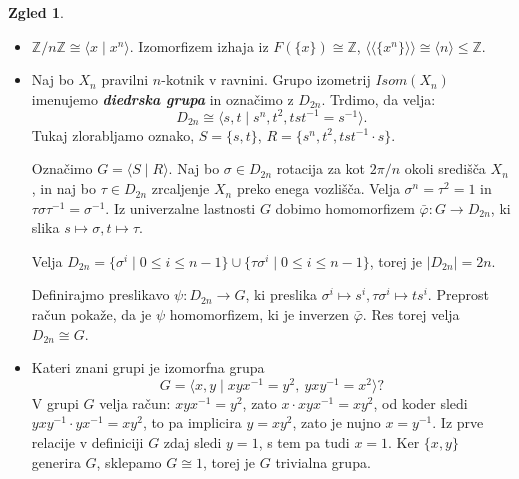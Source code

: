 \documentclass[11pt]{book}
\renewcommand{\llangle}{\langle\langle}
\renewcommand{\rrangle}{\rangle\rangle}
\def\ZZ{\mathbb{Z}}
\def\definicija{\color{rdeca}\bf\em}
\theoremstyle{definition}
\theoremstyle{zgled}
\newtheorem*{zgled}{Zgled}
\theoremstyle{odprtproblem}
\theoremstyle{domacanaloga}
\theoremstyle{izrek}
\begin{document}
\begin{zgled}
\begin{itemize}
    \item $\ZZ/n\ZZ \cong \langle x \mid x^n \rangle$. Izomorfizem izhaja iz $F(\{ x \}) \cong \ZZ$, $\llangle \{ x^n \} \rrangle \cong \langle n \rangle \leq \ZZ$.

    \item Naj bo $X_n$ pravilni $n$-kotnik v ravnini. Grupo izometrij $Isom(X_n)$ imenujemo {\definicija diedrska grupa} in označimo z $D_{2n}$. Trdimo, da velja:
    \[
    D_{2n} \cong \langle s, t \mid s^n, t^2, t s t^{-1} = s^{-1} \rangle.
    \]
    Tukaj zlorabljamo oznako, $S = \{ s, t \}$, $R = \{ s^n, t^2, t s t^{-1} \cdot s \}$. 

    Označimo $G = \langle S \mid R \rangle$. Naj bo $\sigma \in D_{2n}$ rotacija za kot $2 \pi / n$ okoli središča $X_n$, in naj bo $\tau \in D_{2n}$ zrcaljenje $X_n$ preko enega vozlišča. Velja $\sigma^n = \tau^2 = 1$ in $\tau \sigma \tau^{-1} = \sigma^{-1}$. Iz univerzalne lastnosti $G$ dobimo homomorfizem $\bar \varphi \colon G \to D_{2n}$, ki slika $s \mapsto \sigma, t \mapsto \tau$.

    Velja $D_{2n} = \{ \sigma^i \mid 0 \leq i \leq n-1 \} \cup  \{ \tau \sigma^i \mid 0 \leq i \leq n-1 \}$, torej je $|D_{2n}| = 2n$.

    Definirajmo preslikavo $\psi \colon D_{2n} \to G$, ki preslika $\sigma^i \mapsto s^i, \tau \sigma^i \mapsto t s^i$. Preprost račun pokaže, da je $\psi$ homomorfizem, ki je inverzen $\bar \varphi$. Res torej velja $D_{2n} \cong G$.

    \item Kateri znani grupi je izomorfna grupa 
    \[
    G = \langle x, y \mid x y x^{-1} = y^2, \ y x y^{-1} = x^2 \rangle?
    \]
    V grupi $G$ velja račun: $x y x^{-1} = y^2$, zato $x \cdot x y x^{-1} = x y^2$, od koder sledi $y x y^{-1} \cdot y x^{-1} = x y^2$, to pa implicira $y = x y^2$, zato je nujno $x = y^{-1}$. Iz prve relacije v definiciji $G$ zdaj sledi $y = 1$, s tem pa tudi $x = 1$. Ker $\{ x, y \}$ generira $G$, sklepamo $G \cong 1$, torej je $G$ trivialna grupa.
\end{itemize}
\end{zgled}
\end{document}
